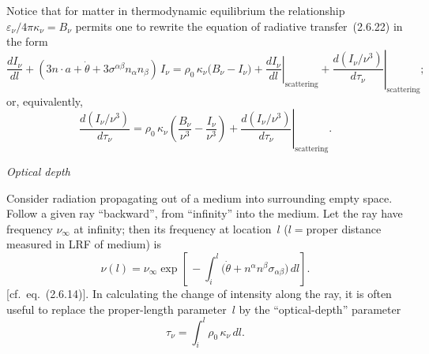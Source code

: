 

Notice that for matter in thermodynamic equilibrium the relationship
$\varepsilon_\nu / 4\pi\kappa_\nu = B_\nu$ permits one to rewrite the equation
of radiative transfer~(2.6.22) in the form
%
\begin{equation}
\tag{2.6.26}
\frac{dI_\nu}{dl} + (3n\cdot a + \dot\theta + 3\sigma^{\alpha\beta}
n_\alpha n_\beta)\, I_\nu
= \rho_0\,\kappa_\nu\bigl(B_\nu - I_\nu\bigr)
  + \left.\frac{dI_\nu}{dl}\right|_{\text{scattering}}
  + \left.\frac{d(I_\nu/\nu^3)}{d\tau_\nu}\right|_{\text{scattering}} ;
\end{equation}
%
or, equivalently,
%
\begin{equation}
\tag{2.6.27}
\frac{d(I_\nu/\nu^3)}{d\tau_\nu}
= \rho_0\,\kappa_\nu \left(\frac{B_\nu}{\nu^3}
  - \frac{I_\nu}{\nu^3}\right)
  + \left.\frac{d(I_\nu/\nu^3)}{d\tau_\nu}\right|_{\text{scattering}}.
\end{equation}


\bigskip
\noindent
\emph{Optical depth}

\medskip
\noindent
Consider radiation propagating out of a medium into surrounding empty space.
Follow a given ray ``backward'', from ``infinity'' into the medium.  Let the ray
have frequency $\nu_\infty$ at infinity; then its frequency at location~$l$
($l = {}$proper distance measured in LRF of medium) is
%
\begin{equation}
\tag{2.6.28}
\nu(l) = \nu_\infty \exp\!\left[\,-\int_i^l
\bigl(\dot\theta + n^\alpha n^\beta \sigma_{\alpha\beta}\bigr)\,dl\right].
\end{equation}
%
[cf.\ eq.~(2.6.14)].  In calculating the change of intensity along the ray, it is
often useful to replace the proper-length parameter~$l$ by the
``optical-depth'' parameter
%
\begin{equation}
\tag{2.6.29}
\tau_\nu = \int_i^l \rho_0\,\kappa_\nu\,dl.
\end{equation}

